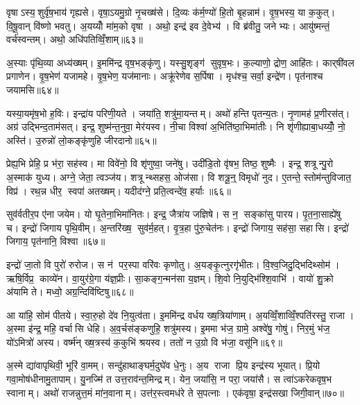 वृषाऽस्य॒शुर्वृ॑ष॒भाय॑ गृह्यसे। वृषा॒ऽयमु॒ग्रो नृ॒चख्ष॑से। दि॒व्यः क॑र्म॒ण्यो॑ हि॒तो बृ॒हन्नाम॑। वृ॒ष॒भस्य॒ या क॒कुत्। वि॒षू॒वान् वि॑ष्णो भवतु। अ॒यय्योँ मा॑म॒को वृषा। अथो॒ इन्द्र॑ इव दे॒वेभ्य॑। वि ब्र॑वीतु॒ जनेभ्यः। आयु॑ष्मन्तं॒ वर्च॑स्वन्तम्। अथो॒ अधि॑पतिव्विँ॒शाम्॥६३॥

अ॒स्याः पृ॑थि॒व्या अध्य॑ख्षम्। इ॒ममि॑न्द्र वृष॒भङ्कृ॑णु। यस्सु॒शृङ्ग॑ सुवृष॒भः। क॒ल्याणो॒ द्रोण॒ आहि॑तः। कार्‌षी॑वल प्रगाणेन। वृ॒ष॒भेण॑ यजामहे। वृ॒ष॒भेण॒ यज॑मानाः। अक्रू॑रेणेव स॒र्पिषा। मृध॑श्च॒ सर्वा॒ इन्द्रे॑ण। पृत॑नाश्च जयामसि॥६४॥

यस्या॒यमृ॑ष॒भो ह॒विः। इन्द्रा॑य परिणी॒यते। जया॑ति॒ शत्रु॑मा॒यन्तम्। अथो॑ हन्ति पृतन्य॒तः। नृ॒णामह॑ प्र॒णीरस॑त्। अग्र॑ उद्भिन्द॒ताम॑सत्। इन्द्र॒ शुष्म॑न्त॒नुवा॒ मेर॑यस्व। नी॒चा विश्वा॑ अ॒भिति॑ष्ठा॒भिमा॑तीः। नि शृ॑णीह्याबा॒धय्योँ॒ नो॒ अस्ति॑। उ॒रुन्नो॑ लो॒कङ्कृ॑णुहि जीरदानो॥६५॥

प्रेह्य॒भि प्रेहि॒ प्र भ॑रा॒ सह॑स्व। मा विवे॑नो॒ वि शृ॑णुष्वा॒ जने॑षु। उदी॑डि॒तो वृ॑षभ॒ तिष्ठ॒ शुष्मैः। इन्द्र॒ शत्रून्पु॒रो अ॒स्माक॑ युध्य। अग्ने॒ जेता॒ त्वञ्ज॑य। शत्रून्थ्सहस॒ ओज॑सा। वि शत्रू॒न्॒ विमृधो॑ नुद। ए॒तन्ते॒ स्तोम॑न्तुविजात॒ विप्र॑। रथ॒न्न धीर॒ स्वपा॑ अतख्षम्। यदीद॑ग्ने॒ प्रति॒त्वन्दे॑व॒ हर्याः॥६६॥

सुव॑र्वतीर॒प ए॑ना जयेम। यो घृ॒तेना॒भिमा॑नितः। इन्द्र॒ जैत्रा॑य जज्ञिषे। स न॒ सङ्का॑सु पारय। पृ॒त॒ना॒साह्ये॑षु च। इन्द्रो॑ जिगाय पृथि॒वीम्। अ॒न्तरि॑ख्ष॒ सुव॑र्म॒हत्। वृ॒त्र॒हा पु॑रु॒चेत॑नः। इन्द्रो॑ जिगाय॒ सह॑सा॒ सहासि। इन्द्रो॑ जिगाय॒ पृत॑नानि॒ विश्वा॥६७॥

इन्द्रो॑ जा॒तो वि पुरो॑ रुरोज। स न॑ पर॒स्पा वरि॑वः कृणोतु। अ॒यङ्कृ॒त्नुरगृ॑भीतः। वि॒श्व॒जिदु॒द्भिदिथ्सोम॑। ऋषि॒र्विप्र॒ काव्ये॑न। वा॒युर॑ग्रे॒गा य॑ज्ञ॒प्रीः। सा॒कङ्ग॒न्मन॑सा य॒ज्ञम्। शि॒वो नि॒युद्भि॑श्शि॒वाभि॑। वायो॑ शु॒क्रो अ॑यामि ते। मध्वो॒ अग्र॒न्दिवि॑ष्टिषु॥६८॥

आ या॑हि॒ सोम॑ पीतये। स्वा॒रु॒हो दे॑व नि॒युत्व॑ता। इ॒ममि॑न्द्र वर्धय ख्ष॒त्रिया॑णाम्। अ॒यव्विँ॒शाव्विँ॒श्पति॑रस्तु॒ राजा। अ॒स्मा इ॑न्द्र॒ महि॒ वर्चासि धेहि। अ॒व॒र्चस॑ङ्कणुहि॒ शत्रु॑मस्य। इ॒ममा भ॑ज॒ ग्रामे॒ अश्वे॑षु॒ गोषु॑। निर॒मुं भ॑ज॒ यो॑ऽमित्रो॑ अस्य। वर्ष्म॑न् ख्ष॒त्रस्य॑ क॒कुभि॑ श्रयस्व। ततो॑ न उ॒ग्रो वि भ॑जा॒ वसू॑नि॥६९॥

अ॒स्मे द्या॑वापृथिवी॒ भूरि॑ वा॒मम्। सन्दु॑हाथाङ्घर्म॒दुघे॑व धे॒नुः। अ॒य राजा प्रि॒य इन्द्र॑स्य भूयात्। प्रि॒यो गवा॒मोष॑धीनामु॒तापाम्। यु॒नज्मि॑ त उत्त॒राव॑न्त॒मिन्द्रम्। येन॒ जया॑सि॒ न परा॒ जया॑सै। स त्वा॑ऽकरेकवृष॒भ स्वानाम्। अथो॑ राजन्नुत्त॒मं मा॑न॒वानाम्। उत्त॑र॒स्त्वमध॑रे ते स॒पत्नाः। एक॑वृषा॒ इन्द्र॑सखा जिगी॒वान्॥७०॥

